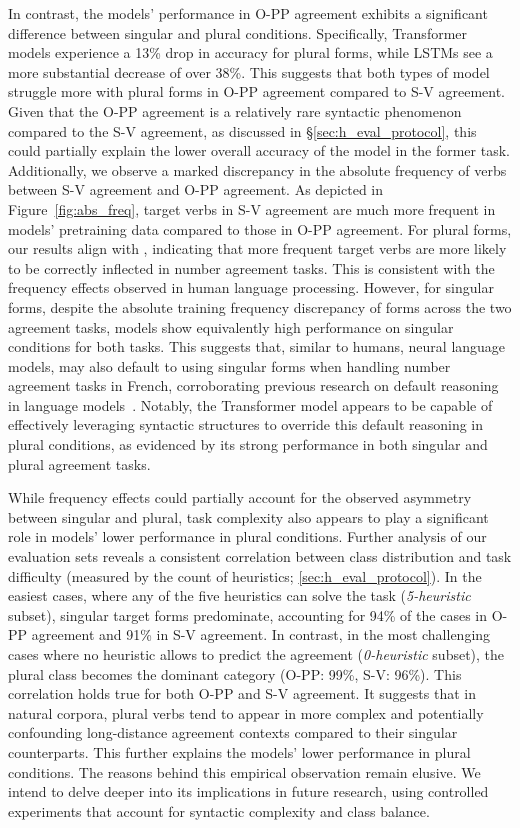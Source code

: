 In contrast, the models' performance in O-PP agreement exhibits a significant difference between singular and plural conditions. Specifically, Transformer models experience a 13\% drop in accuracy for plural forms, while LSTMs see a more substantial decrease of over 38\%. This suggests that both types of model struggle more with plural forms in O-PP agreement compared to S-V agreement.
 Given that the O-PP agreement is a relatively rare syntactic phenomenon compared to the S-V agreement, as discussed in \S\ref{sec:h_eval_protocol}, this could partially explain the lower overall accuracy of the model in the former task. Additionally, we observe a marked discrepancy in the absolute frequency of \target verbs between S-V agreement and O-PP agreement. As depicted in Figure~\ref{fig:abs_freq}, target verbs in S-V agreement are much more frequent in models' pretraining data compared to those in O-PP agreement. For plural forms, our results align with \cite{wei-etal-2021-frequency}, indicating that more frequent target verbs are more likely to be correctly inflected in number agreement tasks. This is consistent with the frequency effects observed in human language processing. However, for singular forms, despite the absolute training frequency discrepancy of \target forms across the two agreement tasks, models show equivalently high performance on singular conditions for both tasks.  
 This suggests that, similar to humans, neural language models, may also default to using singular forms when handling number agreement tasks in French, corroborating previous research on default reasoning in language models~\citep{jumelet-etal-2019-analysing}. Notably, the Transformer model appears to be capable of effectively leveraging syntactic structures to override this default reasoning in plural conditions, as evidenced by its strong performance in both singular and plural agreement tasks.

While frequency effects could partially account for the observed asymmetry between singular and plural, task complexity also appears to play a significant role in models' lower performance in plural conditions. Further analysis of our evaluation sets reveals a consistent correlation between class distribution and task difficulty (measured by the count of heuristics; \textsection\ref{sec:h_eval_protocol}). In the easiest cases, where any of the five heuristics can solve the task (\emph{5-heuristic} subset), singular target forms predominate, accounting for 94\% of the cases in O-PP agreement and 91\% in S-V agreement. In contrast, in the most challenging cases where no heuristic allows to predict the agreement (\emph{0-heuristic} subset), the plural class becomes the dominant category (O-PP: 99\%, S-V: 96\%). This correlation holds true for both O-PP and S-V agreement. It suggests that in natural corpora, plural verbs tend to appear in more complex and potentially confounding long-distance agreement contexts compared to their singular counterparts. This further explains the models' lower performance in plural conditions. The reasons behind this empirical observation remain elusive. We intend to delve deeper into its implications in future research, using controlled experiments that account for syntactic complexity and class balance.

